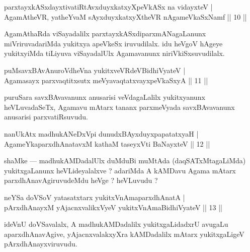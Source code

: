 \begin{shl}
parxtayxkASxdayxtivatiRtAvxduyxkatxyXpeVkASx na vidayxteV |\\
AgamAtheVR, yatheYvaM sAyxduyxkatxyXtheVR nA\s \s gameVkaSxNamf \hfill || 10 || 
\end{shl}

\begin{artha}
AgamAthaRda viSayadalilx parxtayxkASxdiparxmANagaLanunx miVriruvadariMda yukitxya apeVkeSx iruvudilalx. idu heVgoV hAgeye yukitxyiMda tiLiyuva viSayadalUlx Agamavanunx niriVkiSxsuvudilalx.
\end{artha}


\begin{shl}
puMsavxBAvAnuroVdheVna yukitxveVRdeV\s BidhiVyateV |\\
Agamasayx parxvaqtitxsutx meVyavaqtatxvayxpeVkaSxyA \hfill || 11 ||
\end{shl}

\begin{artha}
puruSara savxBAvavanunx anusarisi veVdagaLalilx yukitxyanunx heVLuvadaSeTx, Agamavu mAtarx tananx parxmeVyada savxBAvavanunx anusarisi parxvatiRsuvudu.
\end{artha}


\begin{shl}
nanUkAtx madhukANeDxV\s pi dunudxBAyxduyxpapatatxyaH |\\
AgameYkaparxdhAnatavxM kathaM taseyxVti BaNayxteV \hfill || 12 || 
\end{shl}

\begin{artha}
shaMke --- madhukAMDadalUlx duMduBi muMtAda (daqSATxMtagaLiMda) yukitxgaLanunx heVLideyalalxve ? adariMda A kAMDavu Agama mAtarx parxdhAnavAgiruvudeMdu heVge ? heVLuvudu ?
\end{artha}


\begin{shl}
neYSa doVSoV yatasatxtarx yukitxVnAmaparxdhAnatA |\\
pArxdhAnayxM yAjacnxvalikxVyeV yukitxVnAmaBidhiVyateV \hfill || 13 || 
\end{shl}

\begin{artha}
ideVnU doVSavalalx, A madhukAMDadalilx yukitxgaLidadxrU avugaLu aparxdhAnavAgive, yAjacnxvalakxyXra kAMDadalilx mAtarx yukitxgaLigeV pArxdhAnayxviruvudu.
\end{artha}

